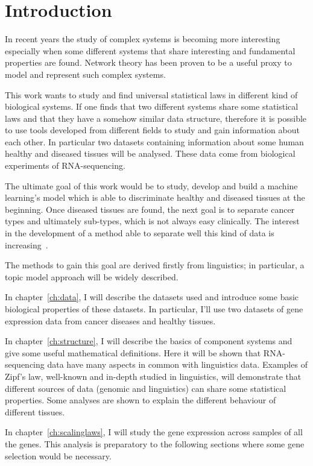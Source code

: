\chapter*{Introduction}\label{ch:intro}
In recent years the study of complex systems is becoming more interesting especially when some different systems that share interesting and fundamental properties are found. Network theory has been proven to be a useful proxy to model and represent such complex systems.

This work wants to study and find universal statistical laws in different kind of biological systems. If one finds that two different systems share some statistical laws and that they have a somehow similar data structure, therefore it is possible to use tools developed from different fields to study and gain information about each other. In particular two datasets containing information about some human healthy and diseased tissues will be analysed. These data come from biological experiments of RNA-sequencing.

The ultimate goal of this work would be to study, develop and build a machine learning's model which is able to discriminate healthy and diseased tissues at the beginning. Once diseased tissues are found, the next goal is to separate cancer types and ultimately sub-types, which is not always easy clinically. The interest in the development of a method able to separate well this kind of data is increasing~\cite{Farver2018}.

The methods to gain this goal are derived firstly from linguistics; in particular, a topic model approach will be widely described.

In chapter~\ref{ch:data}, I will describe the datasets used and introduce some basic biological properties of these datasets. In particular, I'll use two datasets of gene expression data from cancer diseases and healthy tissues.

In chapter~\ref{ch:structure}, I will describe the basics of component systems and give some useful mathematical definitions. Here it will be shown that RNA-sequencing data have many aspects in common with linguistics data. Examples of Zipf's law, well-known and in-depth studied in linguistics, will demonstrate that different sources of data (genomic and linguistics) can share some statistical properties. Some analyses are shown to explain the different behaviour of different tissues.

In chapter~\ref{ch:scalinglaws}, I will study the gene expression across samples of all the genes. This analysis is preparatory to the following sections where some gene selection would be necessary.

